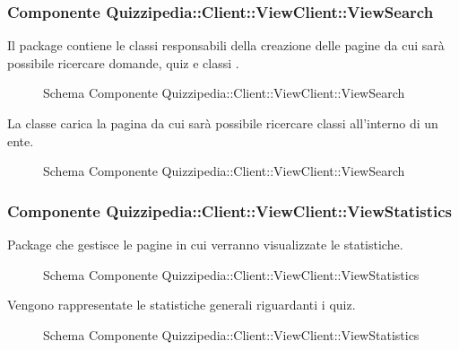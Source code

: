\subsubsection{Componente Quizzipedia::Client::ViewClient::ViewSearch}
Il package contiene le classi responsabili della creazione delle pagine da cui sarà possibile ricercare domande, quiz e classi .
\begin{figure}[H]
\centering
\noindent{}
\caption{Schema Componente Quizzipedia::Client::ViewClient::ViewSearch}
\end{figure}
La classe carica la pagina da cui sarà possibile ricercare classi all'interno di un ente.
\begin{figure}[H]
\centering
\noindent{}
\caption{Schema Componente Quizzipedia::Client::ViewClient::ViewSearch}
\end{figure}
\subsubsection{Componente Quizzipedia::Client::ViewClient::ViewStatistics}
Package che gestisce le pagine in cui verranno visualizzate le statistiche.
\begin{figure}[H]
\centering
\noindent{}
\caption{Schema Componente Quizzipedia::Client::ViewClient::ViewStatistics}
\end{figure}
Vengono rappresentate le statistiche generali riguardanti i quiz.
\begin{figure}[H]
\centering
\noindent{}
\caption{Schema Componente Quizzipedia::Client::ViewClient::ViewStatistics}
\end{figure}
